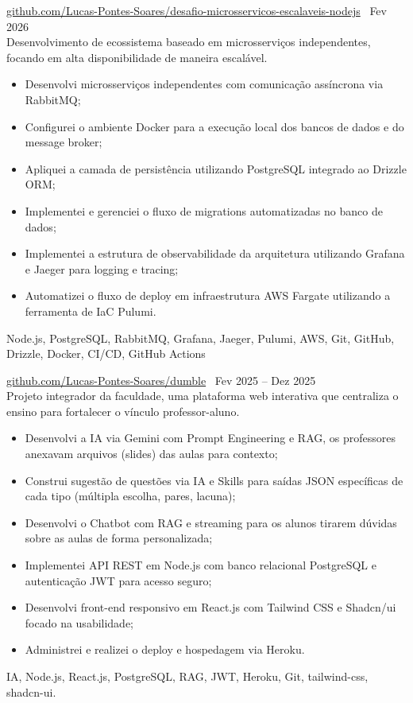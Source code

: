         
 \textbar{}  \href{https://github.com/Lucas-Pontes-Soares/desafio-microsservicos-escalaveis-nodejs}{github.com/Lucas-Pontes-Soares/desafio-microsservicos-escalaveis-nodejs} \hfill\ Fev 2026 \\
Desenvolvimento de ecossistema baseado em microsserviços independentes, focando em alta disponibilidade de maneira escalável.
\begin{itemize}
    \item Desenvolvi microsserviços independentes com comunicação assíncrona via RabbitMQ;
    \item Configurei o ambiente Docker para a execução local dos bancos de dados e do message broker;
    \item Apliquei a camada de persistência utilizando PostgreSQL integrado ao Drizzle ORM;
    \item Implementei e gerenciei o fluxo de migrations automatizadas no banco de dados;
    \item Implementei a estrutura de observabilidade da arquitetura utilizando Grafana e Jaeger para logging e tracing;
    \item Automatizei o fluxo de deploy em infraestrutura AWS Fargate utilizando a ferramenta de IaC Pulumi.
\end{itemize}
 Node.js, PostgreSQL, RabbitMQ, Grafana, Jaeger, Pulumi, AWS, Git, GitHub, Drizzle, Docker, CI/CD, GitHub Actions

        
 \textbar{}  \href{https://github.com/Lucas-Pontes-Soares/dumble}{github.com/Lucas-Pontes-Soares/dumble} \hfill\ Fev 2025 -- Dez 2025 \\
Projeto integrador da faculdade, uma plataforma web interativa que centraliza o ensino para fortalecer o vínculo professor-aluno.
\begin{itemize}
    \item Desenvolvi a IA via Gemini com Prompt Engineering e RAG, os professores anexavam arquivos (slides) das aulas para contexto;
    \item Construi sugestão de questões via IA e Skills para saídas JSON específicas de cada tipo (múltipla escolha, pares, lacuna);
    \item Desenvolvi o Chatbot com RAG e streaming para os alunos tirarem dúvidas sobre as aulas de forma personalizada;
    \item Implementei API REST em Node.js com banco relacional PostgreSQL e autenticação JWT para acesso seguro;
    \item Desenvolvi front-end responsivo em React.js com Tailwind CSS e Shadcn/ui focado na usabilidade;
    \item Administrei e realizei o deploy e hospedagem via Heroku.
\end{itemize}
 IA, Node.js, React.js, PostgreSQL, RAG, JWT, Heroku, Git, tailwind-css, shadcn-ui.

